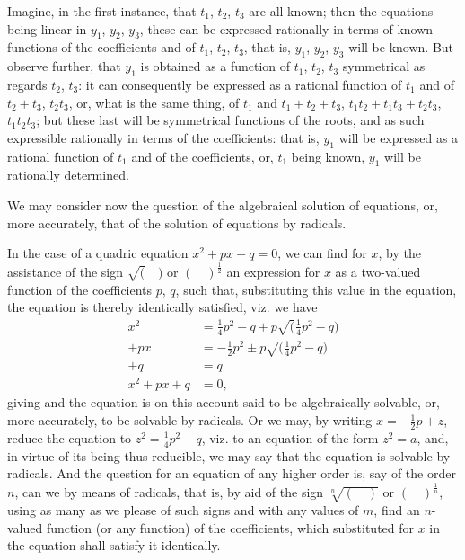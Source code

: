 \documentclass[11pt,a4paper]{book}
\begin{document}
Imagine, in the first instance, that $t_1$, $t_2$, $t_3$ are all known; then the equations being linear in $y_1$, $y_2$, $y_3$, these can be expressed rationally in terms of known functions of the coefficients and of $t_1$, $t_2$, $t_3$, that is, $y_1$, $y_2$, $y_3$ will be known. But observe further, that $y_1$ is obtained as a function of $t_1$, $t_2$, $t_3$ symmetrical as regards $t_2$, $t_3$: it can consequently be expressed as a rational function of $t_1$ and of $t_2 + t_3$, $t_2 t_3$, or, what is the same thing, of $t_1$ and $t_1 + t_2 + t_3$, $t_1 t_2 + t_1 t_3 + t_2 t_3$, $t_1 t_2 t_3$; but these last will be symmetrical functions of the roots, and as such expressible rationally in terms of the coefficients: that is, $y_1$ will be expressed as a rational function of $t_1$ and of the coefficients, or, $t_1$ being known, $y_1$ will be rationally determined.

We may consider now the question of the algebraical solution of equations, or, more accurately, that of the solution of equations by radicals.

In the case of a quadric equation $x^2 + px + q = 0$, we can find for $x$, by the assistance of the sign $\surd(\quad)$ or $(\quad)^{\frac{1}{2}}$ an expression for $x$ as a two-valued function of the coefficients $p$, $q$, such that, substituting this value in the equation, the equation is thereby identically satisfied, viz. we have
\begin{align*}
x^2 &= \tfrac{1}{4}p^2 - q + p\surd(\tfrac{1}{4}p^2 - q) \\
+ px &= -\tfrac{1}{2}p^2 \pm p\surd(\tfrac{1}{4}p^2 - q) \\
+ q &= q \\
\hline
x^2 + px + q &= 0,
\end{align*}
giving and the equation is on this account said to be algebraically solvable, or, more accurately, to be solvable by radicals. Or we may, by writing $x = -\frac{1}{2}p + z$, reduce the equation to $z^2 = \frac{1}{4}p^2 - q$, viz. to an equation of the form $z^2 = a$, and, in virtue of its being thus reducible, we may say that the equation is solvable by radicals. And the question for an equation of any higher order is, say of the order $n$, can we by means of radicals, that is, by aid of the sign $\sqrt[n]{(\quad)}$ or $(\quad)^{\frac{1}{n}}$, using as many as we please of such signs and with any values of $m$, find an $n$-valued function (or any function) of the coefficients, which substituted for $x$ in the equation shall satisfy it identically.
\end{document}
